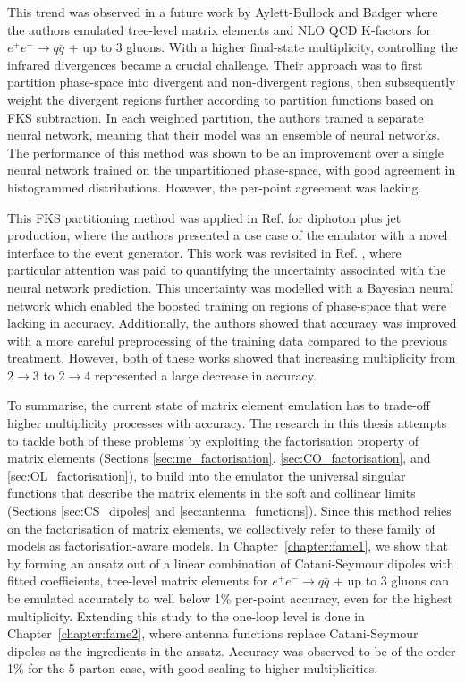 \documentclass[main.tex]{subfiles}
\begin{document}
    This trend was observed in a future work by Aylett-Bullock
    and Badger \cite{Badger:2020uow} where the authors emulated tree-level
    matrix elements and NLO QCD K-factors for $e^{+}e^{-} \rightarrow q \bar{q}$ +
    up to 3 gluons. With a higher final-state multiplicity, controlling
    the infrared divergences became a crucial challenge.
    Their approach was to first partition phase-space
    into divergent and non-divergent regions, then subsequently
    weight the divergent regions further according to partition functions
    based on FKS subtraction.
    In each weighted partition, the authors trained a separate neural network,
    meaning that their model was an ensemble of neural networks.
    The performance of this method was shown to be an improvement
    over a single neural network trained on the unpartitioned phase-space,
    with good agreement in histogrammed distributions. However,
    the per-point agreement was lacking.

    This FKS partitioning method was applied in Ref. \cite{Aylett-Bullock:2021hmo}
    for diphoton plus jet production, where the authors presented a
    use case of the emulator with a novel interface to the {\Sherpa} event generator.
    This work was revisited in Ref. \cite{Badger:2022hwf},
    where particular attention was paid to quantifying the uncertainty associated
    with the neural network prediction. This uncertainty was
    modelled with a Bayesian neural network which enabled
    the boosted training on regions of phase-space that were
    lacking in accuracy. Additionally, the authors showed
    that accuracy was improved with a more careful
    preprocessing of the training data compared to
    the previous treatment.
    However, both of these works showed that increasing
    multiplicity from $2 \rightarrow 3$ to $2 \rightarrow 4$
    represented a large decrease in accuracy.

    To summarise, the current state of matrix element
    emulation has to trade-off higher multiplicity processes
    with accuracy. The research in this thesis attempts to
    tackle both of these problems by exploiting the factorisation
    property of matrix elements (Sections \ref{sec:me_factorisation},
    \ref{sec:CO_factorisation}, and \ref{sec:OL_factorisation}),
    to build into the emulator the universal singular functions
    that describe the matrix elements in the soft and collinear limits
    (Sections \ref{sec:CS_dipoles} and \ref{sec:antenna_functions}).
    Since this method relies on the factorisation of matrix
    elements, we collectively refer to these family of models
    as factorisation-aware models.
    In Chapter~\ref{chapter:fame1}, we show that by forming an ansatz
    out of a linear combination of Catani-Seymour dipoles with
    fitted coefficients, tree-level
    matrix elements for $e^{+}e^{-} \rightarrow q \bar{q}$ + up to 3 gluons
    can be emulated accurately to well below 1\% per-point accuracy,
    even for the highest multiplicity. Extending this study
    to the one-loop level is done in Chapter~\ref{chapter:fame2},
    where antenna functions replace Catani-Seymour dipoles as
    the ingredients in the ansatz. Accuracy was observed to be of the
    order 1\% for the 5 parton case, with good scaling
    to higher multiplicities.
\end{document}
